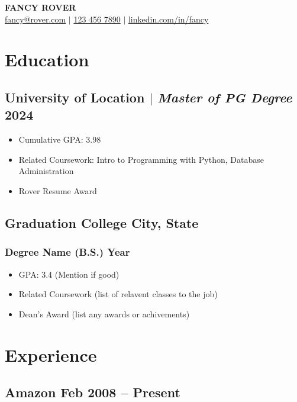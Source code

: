\documentclass[11pt]{article}
\begin{document}
\begin{center}
    {\fontsize{42}{36}\selectfont\bfseries\sffamily FANCY ROVER} \\ \medskip
    {\color{icnclr}\faEnvelope[regular]} \href{mailto:hi@example.com}{fancy@rover.com} $|$ 
    {\color{icnclr}} \href{tel:1234567890}{123 456 7890} $|$
    {\color{icnclr}\faLinkedinIn} \href{https://www.linkedin.com/in/}{linkedin.com/in/fancy}
\end{center}

\section{Education}
\subsection{University of Location $|$ {\normalfont\textit{Master of PG Degree}} \hfill 2024}
\begin{itemize}
    \item Cumulative GPA: 3.98
    \item Related Coursework: Intro to Programming with Python, Database Administration
    \item Rover Resume Award
\end{itemize}

\subsection{Graduation College \hfill City, State}
\subsubsection{Degree Name (B.S.) \hfill Year}
\begin{itemize}
    \item GPA: 3.4 (Mention if good)
    \item Related Coursework (list of relavent classes to the job)
    \item Dean's Award (list any awards or achivements)
\end{itemize}

\section{Experience}
\subsection{Amazon \hfill Feb 2008 -- Present}
\end{document}

